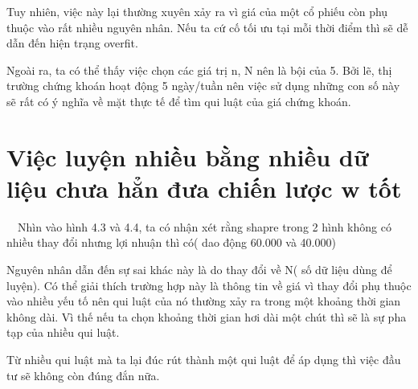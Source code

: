 \documentclass[14pt]{extreport}
\begin{document}
\newpage

Tuy nhiên, việc này lại thường xuyên xảy ra vì giá của một cổ phiếu còn phụ thuộc vào rất nhiều nguyên nhân. Nếu ta cứ cố tối ưu tại mỗi thời điểm thì sẽ dễ dẫn đến hiện trạng overfit.

Ngoài ra, ta có thể thấy việc chọn các giá trị n, N nên là bội của 5. Bởi lẽ, thị trường chứng khoán hoạt động 5 ngày/tuần nên việc sử dụng những con số này sẽ rất có ý nghĩa về mặt thực tế để tìm qui luật của giá chứng khoán.

\newpage

\section{Việc luyện nhiều bằng nhiều dữ liệu chưa hẳn đưa chiến lược w tốt}

$\quad$Nhìn vào hình 4.3 và 4.4, ta có nhận xét rằng shapre trong 2 hình không có nhiều thay đổi nhưng lợi nhuận thì có( dao động 60.000 và 40.000)

Nguyên nhân dẫn đến sự sai khác này là do thay đổi về N( số dữ liệu dùng để luyện). Có thể giải thích trường hợp này là thông tin về giá vì thay đổi phụ thuộc vào nhiều yếu tố nên qui luật của nó thường xảy ra trong một khoảng thời gian không dài. Vì thế nếu ta chọn khoảng thời gian hơi dài một chút thì sẽ là sự pha tạp của nhiều qui luật. 

Từ nhiều qui luật mà ta lại đúc rút thành một qui luật để áp dụng thì việc đầu tư sẽ không còn đúng đắn nữa.
\end{document}
